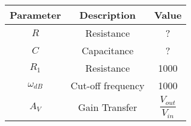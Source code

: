 \begin{tabular}{|c|c|c|}
    \hline
     Parameter & Description & Value \\
    \hline
     $R$ & Resistance & ?\\
     \hline
     $C$ & Capacitance  & ?\\
     \hline
      $R_1$ & Resistance & 1000\\
    \hline
    $\omega_{dB}$ & Cut-off frequency & 1000\\ 
   \hline
    $A_V$ & Gain Transfer & $\dfrac{ V_{out}}{V_{in}}$ \\
    \hline
\end{tabular}